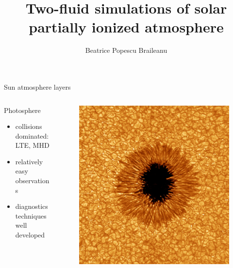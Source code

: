 \documentclass{beamer}
\begin{document}
\title[Two-fluid simulations]  
{Two-fluid simulations of solar partially ionized atmosphere }
\author[]{Beatrice Popescu Braileanu }

\begin{frame}
\maketitle
\end{frame}

\begin{frame}[t]{Sun atmosphere layers}
\vspace*{-22pt}
\begin{columns}[b]
    \begin{column}{0.6\textwidth}
		Photosphere
        \begin{itemize}
					\item collisions dominated: LTE, MHD 
					\item	relatively easy observations 
					\item	diagnostics techniques well developed 
        \end{itemize}
    \end{column}
    \begin{column}{0.5\textwidth}
			\begin{figure}[t]
			 \includegraphics[scale=0.08]{phot.jpg}
			\end{figure}
    \end{column}
\end{columns}


\end{frame}
\end{document}
